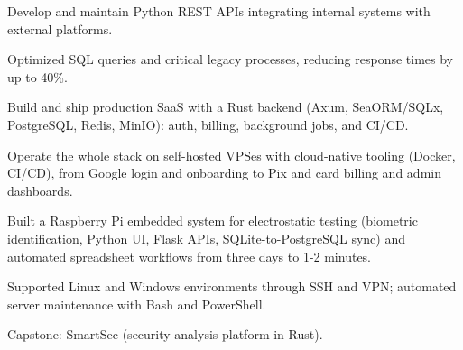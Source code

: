 
\begin{cvbullets}
  \item Develop and maintain Python REST APIs integrating internal systems with external platforms.
  \item Optimized SQL queries and critical legacy processes, reducing response times by up to 40\%.
\end{cvbullets}

\begin{cvbullets}
  \item Build and ship production SaaS with a Rust backend (Axum, SeaORM/SQLx, PostgreSQL, Redis, MinIO): auth, billing, background jobs, and CI/CD.
  \item Operate the whole stack on self-hosted VPSes with cloud-native tooling (Docker, CI/CD), from Google login and onboarding to Pix and card billing and admin dashboards.
\end{cvbullets}

\begin{cvbullets}
  \item Built a Raspberry Pi embedded system for electrostatic testing (biometric identification, Python UI, Flask APIs, SQLite-to-PostgreSQL sync) and automated spreadsheet workflows from three days to 1-2 minutes.
\end{cvbullets}

\begin{cvbullets}
  \item Supported Linux and Windows environments through SSH and VPN; automated server maintenance with Bash and PowerShell.
\end{cvbullets}

Capstone: SmartSec (security-analysis platform in Rust).



